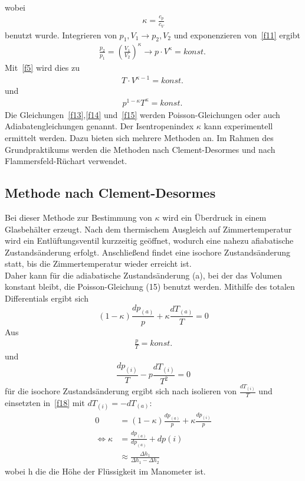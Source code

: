 \documentclass[11pt,a4paper]{article}
\begin{document}
 wobei
 \begin{align}
     \label{f12}
     \kappa = \frac{c_{p}}{c_{V}} 
 \end{align}
 benutzt wurde. Integrieren von $p_{1},V_{1} \rightarrow p_{2},V_{2}$ und exponenzieren
 von~\eqref{f11} ergibt
 \begin{align}
     \label{f13}
     \frac{p_{2}}{p_{1}} = {\left(\frac{V_{1}}{V_{2}}\right)}^{\kappa} \rightarrow
     p \cdot {V}^{\kappa} = konst.\
 \end{align}
 Mit~\eqref{f5} wird dies zu
 \begin{align}
     \label{f14}
     T\cdot{V}^{\kappa-1}=konst.\
 \end{align}
 und
 \begin{align}
     \label{f15}
     {p}^{1-\kappa}{T}^{\kappa}=konst.\
 \end{align}
 Die Gleichungen~\eqref{f13},\eqref{f14} und~\eqref{f15} werden Poisson-Gleichungen
 oder auch Adiabatengleichungen genannt. Der Isentropenindex $\kappa$ kann experimentell
 ermittelt werden. Dazu bieten sich mehrere Methoden an. Im Rahmen des Grundpraktikums
 werden die Methoden nach Clement-Desormes und nach Flammersfeld-R\"uchart verwendet. 
 \newpage
 \subsection{Methode nach Clement-Desormes}
 Bei dieser Methode zur Bestimmung von $\kappa$ wird ein \"Uberdruck in einem
 Glasbeh\"alter erzeugt. Nach dem thermischem Ausgleich auf Zimmertemperatur wird ein
 Entl\"uftungsventil kurzzeitig ge\"offnet, wodurch eine nahezu afiabatische
 Zustands\"anderung erfolgt. Anschlie{\ss}end findet eine isochore Zustands\"anderung
 statt, bis die Zimmertemperatur wieder erreicht ist. \\
  Daher kann für die adiabatische Zustandsänderung (a), bei der das Volumen konstant bleibt, die Poisson-Gleichung (15) benutzt werden. Mithilfe des totalen Differentials ergibt sich
\begin{equation}
    \label{f16}
  (1-\kappa)\frac{dp_{(a)}}{p} + \kappa \frac{dT_{(a)}}{T} = 0
\end{equation}
Aus
\begin{align}
    \label{f17}
  \frac{p}{T} = konst.
\end{align}
und
\begin{equation}
    \label{f18}
  \frac{dp_{(i)}}{T}-p\frac{dT_{(i)}}{T^2}=0
\end{equation}
für die isochore Zustandsänderung ergibt sich nach isolieren von $\frac{dT_{(i)}}{T}$ und einsetzten in~\eqref{f18} mit $dT_{(i)}=-dT_{(a)}$:
\begin{align}
    \label{f19}
    0 & = (1-\kappa)\frac{dp_{(a)}}{p} + \kappa \frac{dp_{(i)}}{p}  \\
  \Leftrightarrow
  \kappa & = \frac{dp_{(a)}}{dp_{(a)}}+dp{(i)} \\
    &\approx \frac{\Delta h_{1}}{\Delta h_{1}-{\Delta}h_{2}}
\end{align}
wobei h die die H\"ohe der Fl\"ussigkeit im Manometer ist.
\end{document}
